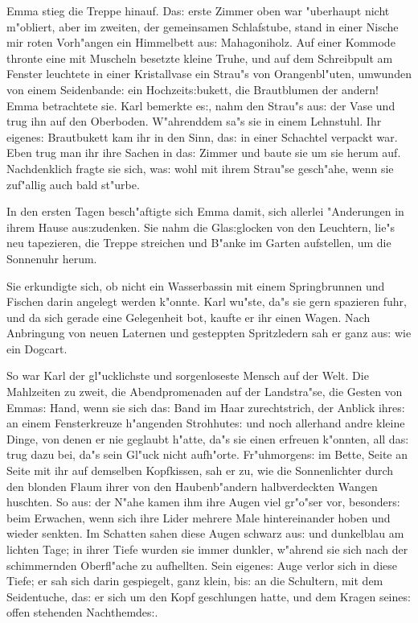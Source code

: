 \documentclass[oneside,12pt]{book}
\newcommand{\s}{s:}%
\begin{document}
Emma stieg die Treppe hinauf. Da{\s} erste Zimmer oben war
"uberhaupt nicht m"obliert, aber im zweiten, der gemeinsamen
Schlafstube, stand in einer Nische mir roten Vorh"angen ein
Himmelbett au{\s} Mahagoniholz. Auf einer Kommode thronte eine mit
Muscheln besetzte kleine Truhe, und auf dem Schreibpult am Fenster
leuchtete in einer Kristallvase ein Strau"s von Orangenbl"uten,
umwunden von einem Seidenbande: ein Hochzeit{\s}bukett, die
Brautblumen der andern! Emma betrachtete sie. Karl bemerkte e{\s},
nahm den Strau"s au{\s} der Vase und trug ihn auf den Oberboden.
W"ahrenddem sa"s sie in einem Lehnstuhl. Ihr eigene{\s}
Brautbukett kam ihr in den Sinn, da{\s} in einer Schachtel
verpackt war. Eben trug man ihr ihre Sachen in da{\s} Zimmer und
baute sie um sie herum auf. Nachdenklich fragte sie sich, wa{\s}
wohl mit ihrem Strau"se gesch"ahe, wenn sie zuf"allig auch bald
st"urbe.

In den ersten Tagen besch"aftigte sich Emma damit, sich allerlei
"Anderungen in ihrem Hause au{\s}zudenken. Sie nahm die
Gla{\s}glocken von den Leuchtern, lie"s neu tapezieren, die Treppe
streichen und B"anke im Garten aufstellen, um die Sonnenuhr herum.

Sie erkundigte sich, ob nicht ein Wasserbassin mit einem
Springbrunnen und Fischen darin angelegt werden k"onnte. Karl
wu"ste, da"s sie gern spazieren fuhr, und da sich gerade eine
Gelegenheit bot, kaufte er ihr einen Wagen. Nach Anbringung von
neuen Laternen und gesteppten Spritzledern sah er ganz au{\s} wie
ein Dogcart.

So war Karl der gl"ucklichste und sorgenloseste Mensch auf der
Welt. Die Mahlzeiten zu zweit, die Abendpromenaden auf der
Landstra"se, die Gesten von Emma{\s} Hand, wenn sie sich da{\s}
Band im Haar zurechtstrich, der Anblick ihre{\s} an einem
Fensterkreuze h"angenden Strohhute{\s} und noch allerhand andre
kleine Dinge, von denen er nie geglaubt h"atte, da"s sie einen
erfreuen k"onnten, all da{\s} trug dazu bei, da"s sein Gl"uck
nicht aufh"orte. Fr"uhmorgen{\s} im Bette, Seite an Seite mit ihr
auf demselben Kopfkissen, sah er zu, wie die Sonnenlichter durch
den blonden Flaum ihrer von den Haubenb"andern halbverdeckten
Wangen huschten. So au{\s} der N"ahe kamen ihm ihre Augen viel
gr"o"ser vor, besonder{\s} beim Erwachen, wenn sich ihre Lider
mehrere Male hintereinander hoben und wieder senkten. Im Schatten
sahen diese Augen schwarz au{\s} und dunkelblau am lichten Tage;
in ihrer Tiefe wurden sie immer dunkler, w"ahrend sie sich nach
der schimmernden Oberfl"ache zu aufhellten. Sein eigene{\s} Auge
verlor sich in diese Tiefe; er sah sich darin gespiegelt, ganz
klein, bi{\s} an die Schultern, mit dem Seidentuche, da{\s} er
sich um den Kopf geschlungen hatte, und dem Kragen seine{\s} offen
stehenden Nachthemde{\s}.
\end{document}
